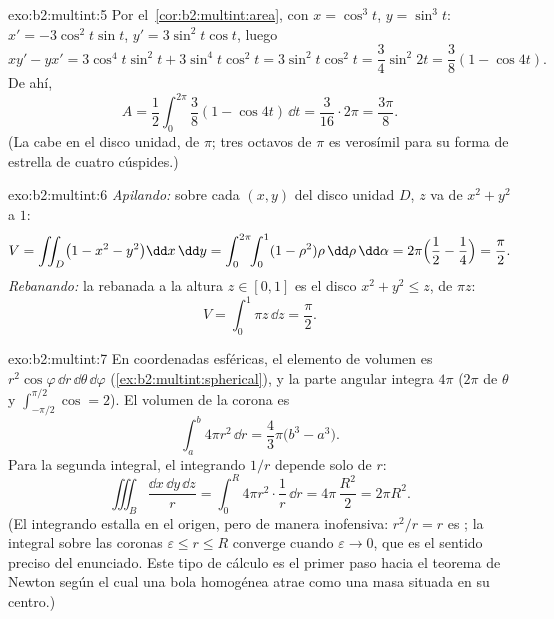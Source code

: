 \begin{solution}{exo:b2:multint:5}
Por el~\cref{cor:b2:multint:area}, con $x = \cos^3 t$, $y = \sin^3
t$: $x' = -3\cos^2 t\sin t$, $y' = 3\sin^2 t\cos t$, luego
\[
xy' - yx' = 3\cos^4 t\sin^2 t + 3\sin^4 t\cos^2 t
= 3\sin^2 t\cos^2 t = \frac{3}{4}\sin^2 2t
= \frac{3}{8}(1 - \cos 4t) .
\]
De ahí,
\[
A = \frac12\int_0^{2\pi}\frac38(1 - \cos 4t)\,\dd t
= \frac{3}{16}\cdot 2\pi = \frac{3\pi}{8} .
\]
(La  cabe en el disco unidad, de  $\pi$; tres octavos de
$\pi$ es verosímil para su forma de estrella de cuatro cúspides.)
\end{solution}

\begin{solution}{exo:b2:multint:6}
\emph{Apilando:} sobre cada $(x, y)$ del disco unidad $D$, $z$ va de
$x^2 + y^2$ a $1$:
\[
V = \iint_D \bigl(1 - x^2 - y^2\bigr)\dd x\,\dd y
= \int_0^{2\pi}\!\!\int_0^1 (1 - \rho^2)\rho\,\dd\rho\,\dd\alpha
= 2\pi\Bigl(\frac12 - \frac14\Bigr) = \frac\pi2 .
\]
\emph{Rebanando:} la rebanada a la altura $z \in [0, 1]$ es el disco
$x^2 + y^2 \leq z$, de  $\pi z$:
\[
V = \int_0^1 \pi z\,\dd z = \frac\pi2 .
\]
\end{solution}

\begin{solution}{exo:b2:multint:7}
En coordenadas esféricas, el elemento de volumen es
$r^2\cos\varphi\,\dd r\,\dd\theta\,\dd\varphi$
(\cref{ex:b2:multint:spherical}), y la parte angular integra $4\pi$
($2\pi$ de $\theta$ y $\int_{-\pi/2}^{\pi/2}\cos = 2$). El volumen de
la corona es
\[
\int_a^b 4\pi r^2\,\dd r = \frac43\pi\bigl(b^3 - a^3\bigr).
\]
Para la segunda integral, el integrando $1/r$ depende solo de $r$:
\[
\iiint_B \frac{\dd x\,\dd y\,\dd z}{r}
= \int_0^R 4\pi r^2\cdot\frac1r\,\dd r
= 4\pi\,\frac{R^2}{2} = 2\pi R^2 .
\]
(El integrando estalla en el origen, pero de manera inofensiva:
$r^2/r = r$ es ; la integral sobre las coronas $\varepsilon
\leq r \leq R$ converge cuando $\varepsilon \to 0$, que es el sentido
preciso del enunciado. Este tipo de cálculo es el primer paso hacia
el teorema de Newton según el cual una bola homogénea atrae como una
masa  situada en su centro.)
\end{solution}

